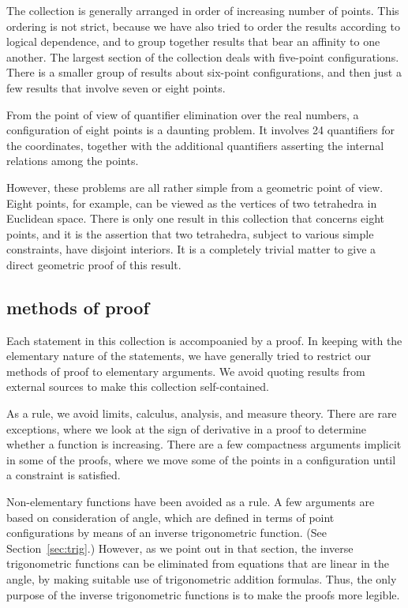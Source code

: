 The collection is generally
arranged in order of increasing number of points.  This ordering
is not strict, because we have also tried to order the results
according to logical dependence, and to group together results 
that bear an affinity to one another.  The largest section of
the collection deals with five-point configurations.  
There is a smaller group of results about six-point configurations,
and then just a few results that involve seven or eight points.

From the point of view of quantifier elimination over the real
numbers, a configuration
of eight points is a daunting problem.  It involves 24 quantifiers
for the coordinates,  together with the additional
quantifiers asserting the internal relations among the points.



However, these problems are all rather simple from a geometric
point of view.  Eight points, for example, can be viewed as the
vertices of two tetrahedra in Euclidean space.    There is only
one result in this collection that concerns eight points, and
it is the assertion that two tetrahedra, subject to various
simple constraints, have disjoint interiors.  It is a completely
trivial
matter to give a direct geometric proof of this result.


\subsection{methods of proof}

Each statement in this collection is accompoanied by a proof.
In keeping with the elementary nature of the statements, 
we have generally tried to restrict our methods of proof to
elementary arguments.  We avoid quoting results from external
sources to make this collection self-contained.

As a rule, we avoid limits, calculus, analysis, and measure theory.
There are rare exceptions, where we look at the sign of derivative in a proof
to determine whether a function is increasing. 
There are a few compactness arguments implicit in some
of the proofs, where we move some of the points in a configuration
until a constraint is satisfied.

Non-elementary functions have been avoided as a rule.  A few
arguments are based on consideration of angle, which are defined
in terms of point configurations by means of an inverse trigonometric
function.  (See Section~\ref{sec:trig}.)  However, as we point
out in that section, the inverse trigonometric functions can be
eliminated from equations that are linear in the angle, by making
suitable use of trigonometric addition formulas.  Thus, the only purpose of
the inverse trigonometric functions is to make the
proofs more legible.

